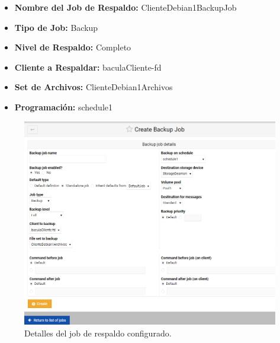 \begin{minipage}[t]{0.45\textwidth}
    \vspace{0pt} %
    \begin{itemize}
        \item \textbf{Nombre del Job de Respaldo:} ClienteDebian1BackupJob
        \item \textbf{Tipo de Job:} Backup
        \item \textbf{Nivel de Respaldo:} Completo
        \item \textbf{Cliente a Respaldar:} baculaCliente-fd
        \item \textbf{Set de Archivos:} ClienteDebian1Archivos
        \item \textbf{Programación:} schedule1
        
    \end{itemize}

    \end{minipage}%
    \hfill %
    \begin{minipage}[t]{0.45\textwidth}
    \vspace{0pt} %
    \centering %
      
    

    \begin{figure}[H]
        \centering
        \includegraphics[width=0.95\linewidth]{instalacionBacula/Backupjobdetails.png}
        \caption{Detalles del job de respaldo configurado.}
    \end{figure}
    \end{minipage}


